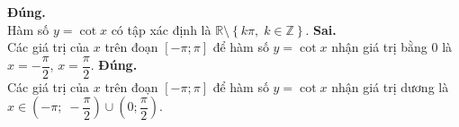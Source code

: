 \begin{ex}
{\begin{itemchoice}
			 \itemch \textbf{Đúng.}\\
			Hàm số $y=\cot x$ có tập xác định là $\mathbb{R}\setminus \left\{k\pi, \;  k\in \mathbb{Z}\right\}$.
			\itemch  \textbf{Sai.}\\
			Các giá trị của $x$ trên đoạn $\left[-\pi; \pi  \right]$ để hàm số $y=\cot x$ nhận giá trị bằng $0$ là $x=-\dfrac{\pi}{2}$, $x=\dfrac{\pi}{2}$.
			\itemch \textbf{Đúng.}\\ 
			 Các giá trị của $x$ trên đoạn $\left[-\pi; \pi \right]$ để hàm số $y=\cot x$ nhận giá trị dương là \\
			$x\in \left(-\pi;  \;-\dfrac{\pi}{2}\right)\cup \left(0; \dfrac{\pi}{2}\right)$.
		\end{itemchoice}
	 }
\end{ex}

